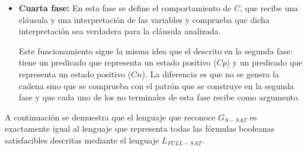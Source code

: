 \begin{itemize}
    \item \textbf{Cuarta fase:} En esta fase se define el comportamiento de $C$, que recibe una cláusula y una
          interpretación de las variables y comprueba que dicha interpretación sea verdadera para la cláusula analizada.
          \begin{enumerate}[start=23]
          \end{enumerate}
          
          Este funcionamiento sigue la misma idea que el descrito en la segunda fase: tiene un predicado que representa un estado positivo ($Cp$) y un predicado que representa un estado positivo ($Cn$). La diferencia es que no se genera la cadena sino que se comprueba con el patrón que se construye en la segunda fase y que cada uno de los no terminales de esta fase recibe como argumento.        
\end{itemize}

A continuación se demuestra que el lenguaje que reconoce $G_{S-SAT}$ es exactamente igual al lenguaje que representa todas las fórmulas booleanas satisfacibles descritas mediante el lenguaje $L_{FULL-SAT}$.

